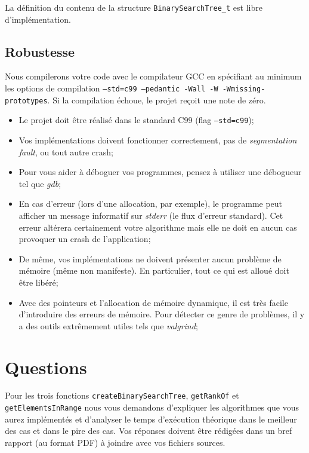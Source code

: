 \documentclass[a4paper,10pt]{article}
\begin{document}
La définition du contenu de la structure \texttt{BinarySearchTree\_t} est libre d'implémentation.

\subsection*{Robustesse}

Nous compilerons votre code avec le compilateur GCC en spécifiant au
minimum les options de compilation \texttt{--std=c99 --pedantic -Wall -W -Wmissing-
prototypes}. Si la compilation échoue, le projet reçoit une note de zéro.

\begin{itemize}
\item Le projet doit être réalisé dans le standard C99 (flag \texttt{--std=c99});
\item Vos implémentations doivent fonctionner correctement, pas de {\em segmentation fault}, ou tout autre crash;
\item Pour vous aider à déboguer vos programmes, pensez à utiliser une débogueur tel que {\em gdb};
\item En cas d'erreur (lors d'une allocation, par exemple), le programme peut afficher un message informatif sur {\em stderr} (le flux d'erreur standard). Cet erreur altérera certainement votre algorithme mais elle ne doit en aucun cas provoquer un crash de l'application;
\item De même, vos implémentations ne doivent présenter aucun problème de mémoire (même non manifeste). En particulier, tout ce qui est alloué doit être libéré;
\item Avec des pointeurs et l’allocation de mémoire dynamique, il est très facile d’introduire des erreurs de mémoire. Pour détecter ce genre de problèmes, il y a des outils extrêmement utiles tels que {\em valgrind};
\end{itemize}

\section{Questions}

Pour les trois fonctions \texttt{createBinarySearchTree}, \texttt{getRankOf} et
\texttt{getElementsInRange} nous vous demandons d'expliquer les algorithmes que
vous aurez implémentés et d'analyser le temps d'exécution théorique dans le
meilleur des cas et dans le pire des cas. Vos réponses doivent être
rédigées dans un bref rapport (au format PDF) à joindre avec vos fichiers
sources.
\end{document}
